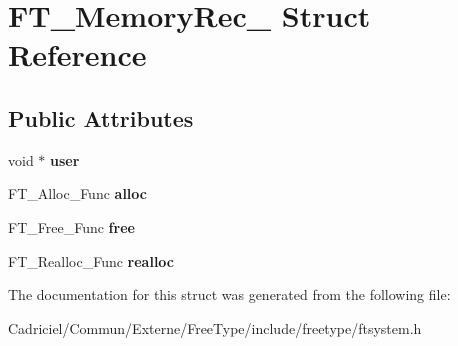 \hypertarget{struct_f_t___memory_rec__}{}\section{F\+T\+\_\+\+Memory\+Rec\+\_\+ Struct Reference}
\label{struct_f_t___memory_rec__}
\subsection*{Public Attributes}
\begin{DoxyCompactItemize}
\item 
void $\ast$ {\bfseries user}\hypertarget{struct_f_t___memory_rec___aae5bc614434ba4525e37d7faaf03c4b7}{}\label{struct_f_t___memory_rec___aae5bc614434ba4525e37d7faaf03c4b7}

\item 
F\+T\+\_\+\+Alloc\+\_\+\+Func {\bfseries alloc}\hypertarget{struct_f_t___memory_rec___a2269eada6afbb008fe5c73707145410c}{}\label{struct_f_t___memory_rec___a2269eada6afbb008fe5c73707145410c}

\item 
F\+T\+\_\+\+Free\+\_\+\+Func {\bfseries free}\hypertarget{struct_f_t___memory_rec___a83ab2422bd9265d8731b9e5e368ba240}{}\label{struct_f_t___memory_rec___a83ab2422bd9265d8731b9e5e368ba240}

\item 
F\+T\+\_\+\+Realloc\+\_\+\+Func {\bfseries realloc}\hypertarget{struct_f_t___memory_rec___a5ce3424cc72e898fe973ffeabe44a95c}{}\label{struct_f_t___memory_rec___a5ce3424cc72e898fe973ffeabe44a95c}

\end{DoxyCompactItemize}


The documentation for this struct was generated from the following file\+:\begin{DoxyCompactItemize}
\item 
Cadriciel/\+Commun/\+Externe/\+Free\+Type/include/freetype/ftsystem.\+h\end{DoxyCompactItemize}
